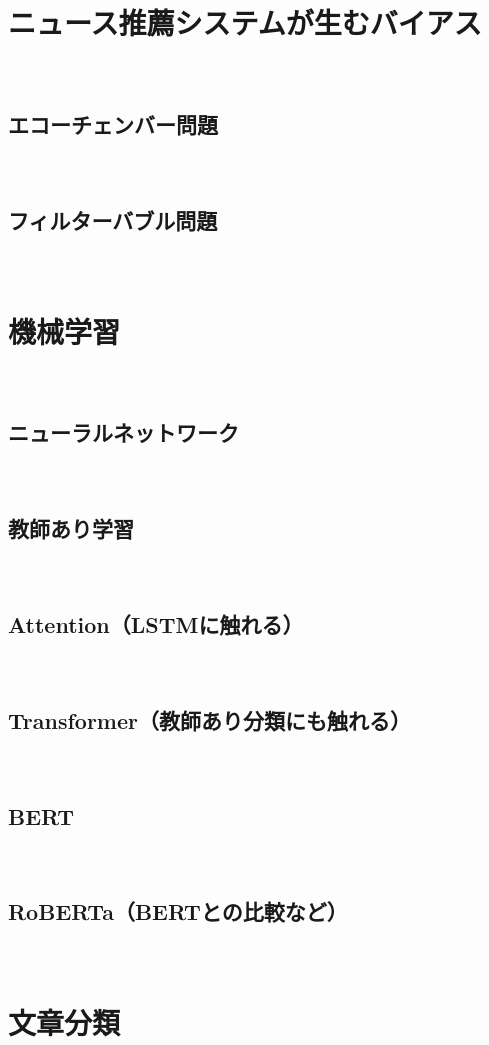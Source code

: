 \documentclass[12pt,a4j]{jreport}
\begin{document}
\section{ニュース推薦システムが生むバイアス}
~

\subsection{エコーチェンバー問題}
~

\subsection{フィルターバブル問題}
~

\section{機械学習}
~

\subsection{ニューラルネットワーク}
~

\subsection{教師あり学習}
~

\subsection{Attention（LSTMに触れる）}
~

\subsection{Transformer（教師あり分類にも触れる）}
~

\subsection{BERT}
~

\subsection{RoBERTa（BERTとの比較など）}
~

\section{文章分類}
~
\end{document}
